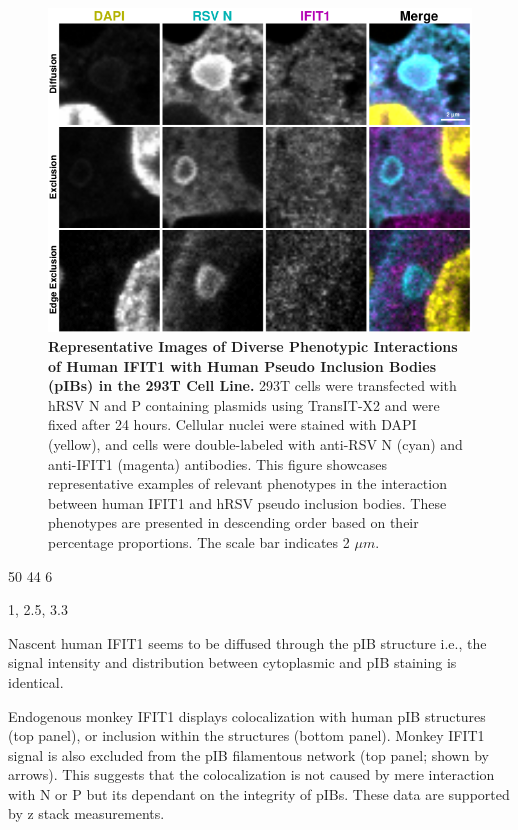 \begin{figure}
    \centering
    \includegraphics[width=1\linewidth]{08. Chapter 3/Figs/03. pIB/02. IFIT1/03. i1-293t-hnhp.pdf}
    \caption[Representative Images of Diverse Phenotypic Interactions of Human IFIT1 with Human Pseudo Inclusion Bodies (pIBs) in the 293T Cell Line.]{\textbf{Representative Images of Diverse Phenotypic Interactions of Human IFIT1 with Human Pseudo Inclusion Bodies (pIBs) in the 293T Cell Line.} 293T cells were transfected with hRSV N and P containing plasmids using TransIT-X2 and were fixed after 24 hours. Cellular nuclei were stained with DAPI (yellow), and cells were double-labeled with anti-RSV N (cyan) and anti-IFIT1 (magenta) antibodies. This figure showcases representative examples of relevant phenotypes in the interaction between human IFIT1 and hRSV pseudo inclusion bodies. These phenotypes are presented in descending order based on their percentage proportions. The scale bar indicates 2 \(\mu m\).}
    \label{fig:Representative Images of Diverse Phenotypic Interactions of Human IFIT1 with Human Pseudo Inclusion Bodies (pIBs) in the 293T Cell Line}
\end{figure}

50 44 6

1, 2.5, 3.3


Nascent human IFIT1 seems to be diffused through the pIB structure i.e., the signal intensity and distribution between cytoplasmic and pIB staining is identical.  

Endogenous monkey IFIT1 displays colocalization with human pIB structures (top panel), or inclusion within the structures (bottom panel). Monkey IFIT1 signal is also excluded from the pIB filamentous network (top panel; shown by arrows). This suggests that the colocalization is not caused by mere interaction with N or P but its dependant on the integrity of pIBs. These data are supported by z stack measurements.  


